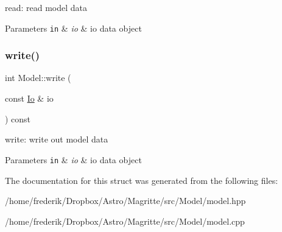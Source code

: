 read\+: read model data 
\begin{DoxyParams}[1]{Parameters}
\mbox{\tt in}  & {\em io} & io data object \\
\hline
\end{DoxyParams}
\mbox{\label{structModel_a2d851441d0343b15e8e5affd2f786678}} 
\subsubsection{\texorpdfstring{write()}{write()}}
{\footnotesize\ttfamily int Model\+::write (\begin{DoxyParamCaption}\item[{const \mbox{\hyperlink{structIo}{Io}} \&}]{io }\end{DoxyParamCaption}) const}

write\+: write out model data 
\begin{DoxyParams}[1]{Parameters}
\mbox{\tt in}  & {\em io} & io data object \\
\hline
\end{DoxyParams}


The documentation for this struct was generated from the following files\+:\begin{DoxyCompactItemize}
\item 
/home/frederik/\+Dropbox/\+Astro/\+Magritte/src/\+Model/model.\+hpp\item 
/home/frederik/\+Dropbox/\+Astro/\+Magritte/src/\+Model/model.\+cpp\end{DoxyCompactItemize}
